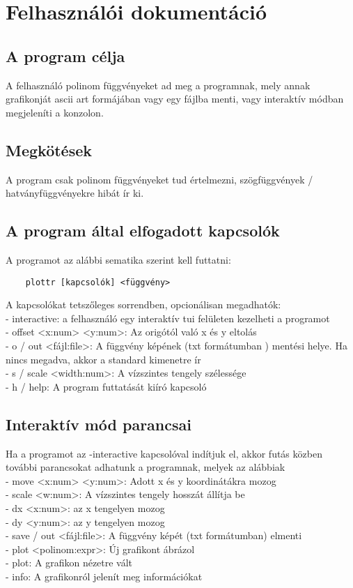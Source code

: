 \section*{Felhasználói dokumentáció}

\subsection*{A program célja}
A felhasználó polinom függvényeket ad meg a programnak, mely annak grafikonját ascii art formájában
vagy egy fájlba menti, vagy interaktív módban megjeleníti a konzolon.

\subsection*{Megkötések}
A program csak polinom függvényeket tud értelmezni, szögfüggvények / hatványfüggvényekre hibát ír ki.


\subsection*{A program által elfogadott kapcsolók}
A programot az alábbi sematika szerint kell futtatni:
\begin{verbatim}
    plottr [kapcsolók] <függvény>
\end{verbatim}
A kapcsolókat tetszőleges sorrendben, opcionálisan megadhatók:\\
 - interactive: a felhasználó egy interaktív tui felületen kezelheti a programot\\
 - offset <x:num> <y:num>: Az origótól való x és y eltolás\\
 - o / out <fájl:file>: A függvény képének (txt formátumban ) mentési helye.
        Ha nincs megadva, akkor a standard kimenetre ír\\
 - s / scale <width:num>: A vízszintes tengely szélessége\\
 - h / help: A program futtatását kiíró kapcsoló\\

\subsection*{Interaktív mód parancsai}
Ha a programot az -interactive kapcsolóval indítjuk el, akkor futás közben
további parancsokat adhatunk a programnak, melyek az alábbiak\\
 - move <x:num> <y:num>: Adott x és y koordinátákra mozog\\
 - scale <w:num>: A vízszintes tengely hosszát állítja be\\
 - dx <x:num>: az x tengelyen mozog\\
 - dy <y:num>: az y tengelyen mozog\\
 - save / out <fájl:file>: A függvény képét (txt formátumban) elmenti\\
 - plot <polinom:expr>: Új grafikont ábrázol\\
 - plot: A grafikon nézetre vált\\
 - info: A grafikonról jelenít meg információkat\\